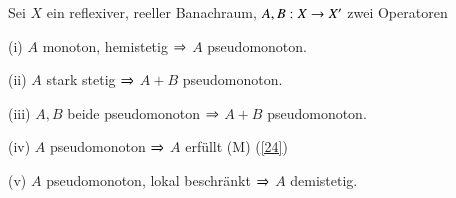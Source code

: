 \begin{lem}\label{4.16}
    Sei $X$ ein reflexiver, reeller Banachraum, $A,B: X\rightarrow X'$ zwei Operatoren
    \begin{description}
        \item{(i)}
        $A$ monoton, hemistetig $\Rightarrow$ $A$ pseudomonoton.
        \item{(ii)}
        $A$ stark stetig $\Rightarrow$ $A+ B$ pseudomonoton.
        \item{(iii)}
        $A, B$ beide pseudomonoton $\Rightarrow$ $A+ B$ pseudomonoton.
        \item{(iv)}
        $A$ pseudomonoton $\Rightarrow$ $A$ erfüllt (M) (\ref{24})
        \item{(v)}
        $A$ pseudomonoton, lokal beschränkt $\Rightarrow$ $A$ demistetig.
    \end{description}
\end{lem}

